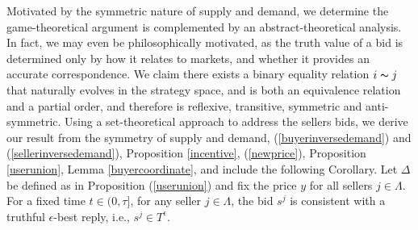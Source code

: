 Motivated by the symmetric nature of supply and demand, we determine the
game-theoretical argument is complemented by an abstract-theoretical analysis.
In fact, we may even be philosophically motivated, as the truth value of a bid
is determined only by how it relates to markets, and whether it provides an
accurate correspondence.
We claim there exists a binary equality relation $i\thicksim j$ that naturally evolves in the strategy space, and is both an equivalence relation and a partial order,
and therefore is reflexive, transitive, symmetric and anti-symmetric.
Using a set-theoretical approach to address the sellers bids, we derive our result from the symmetry of supply and demand,
(\ref{buyerinversedemand}) and (\ref{sellerinversedemand}), Proposition
\ref{incentive}, (\ref{newprice}), Proposition \ref{userunion}, Lemma
\ref{buyercoordinate}, and include the following Corollary.
{
Let $\Delta$ be defined as in Proposition (\ref{userunion}) and fix the price $y$ for all sellers $j\in\Lambda$. For a fixed time $t\in (0,\tau]$, for any seller $j\in \Lambda$, the bid $s^j$ is consistent with a truthful
$\epsilon$-best reply, i.e., $s^j \in T^\epsilon$.
}\\
